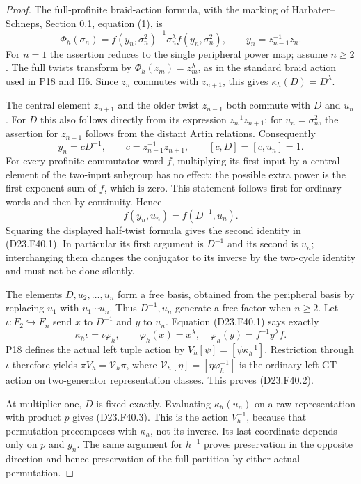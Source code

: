 \begin{proof}
The full-profinite braid-action formula, with the marking of
Harbater--Schneps, Section 0.1, equation (1), is
\[
 \Phi_h(\sigma_n)=f(y_n,\sigma_n^2)^{-1}
                        \sigma_n^\lambda f(y_n,\sigma_n^2),
 \qquad y_n=z_{n-1}^{-1}z_n.
\]
For $n=1$ the assertion reduces to the single peripheral
power map; assume $n\geq2$. The full twists transform by
$\Phi_h(z_m)=z_m^\lambda$, as in the standard braid action
used in P18 and H6. Since $z_n$ commutes with $z_{n+1}$,
this gives $\kappa_h(D)=D^\lambda$.

The central element $z_{n+1}$ and the older twist
$z_{n-1}$ both commute with $D$ and $u_n$. For $D$ this
also follows directly from its expression
$z_n^{-1}z_{n+1}$; for $u_n=\sigma_n^2$, the assertion
for $z_{n-1}$ follows from the distant Artin relations.
Consequently
\[
          y_n=cD^{-1},\qquad
          c=z_{n-1}^{-1}z_{n+1},\qquad [c,D]=[c,u_n]=1.
\]
For every profinite commutator word $f$, multiplying its first
input by a central element of the two-input subgroup has no
effect: the possible extra power is the first exponent sum
of $f$, which is zero. This statement follows first for
ordinary words and then by continuity. Hence
\[
                       f(y_n,u_n)=f(D^{-1},u_n).
\]
Squaring the displayed half-twist formula gives the second
identity in (D23.F40.1). In particular its first argument is
$D^{-1}$ and its second is $u_n$; interchanging them changes
the conjugator to its inverse by the two-cycle identity and
must not be done silently.

The elements $D,u_2,\ldots,u_n$ form a free basis, obtained
from the peripheral basis by replacing $u_1$ with
$u_1\cdots u_n$. Thus $D^{-1},u_n$ generate a free factor
when $n\geq2$. Let $\iota:F_2\hookrightarrow F_n$ send
$x$ to $D^{-1}$ and $y$ to $u_n$. Equation (D23.F40.1)
says exactly
\[
                   \kappa_h\iota=\iota\varphi_h,
 \qquad
 \varphi_h(x)=x^\lambda,\quad
 \varphi_h(y)=f^{-1}y^\lambda f.
\]
P18 defines the actual left tuple action by
$V_h[\psi]=[\psi\kappa_h^{-1}]$. Restriction through
$\iota$ therefore yields
$\pi V_h=\mathcal V_h\pi$, where
$\mathcal V_h[\eta]=[\eta\varphi_h^{-1}]$ is the ordinary
left GT action on two-generator representation classes.
This proves (D23.F40.2).

At multiplier one, $D$ is fixed exactly. Evaluating
$\kappa_h(u_n)$ on a raw representation with product $p$
gives (D23.F40.3). This is the action $V_h^{-1}$, because
that permutation precomposes with $\kappa_h$, not its
inverse. Its last coordinate depends only on $p$ and $g_n$.
The same argument for $h^{-1}$ proves preservation in the
opposite direction and hence preservation of the full
partition by either actual permutation.
\end{proof}

